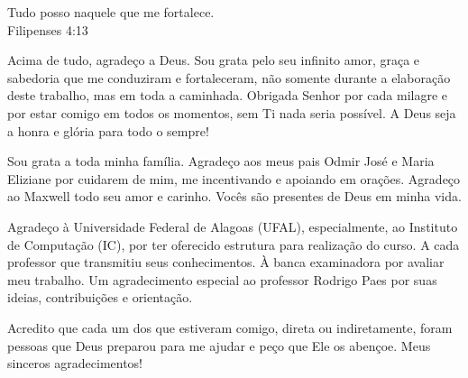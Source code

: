 \documentclass{ppgi}
\begin{document}
\imprimircapa
\imprimirfolhaderosto

\begin{dedicatoria}
\prededicatoria

\begin{flushright}
Tudo posso naquele que me fortalece.\\
Filipenses 4:13
\end{flushright}

\end{dedicatoria}

\begin{agradecimentos}

Acima de tudo, agradeço a Deus. Sou grata pelo seu infinito amor, graça e sabedoria que me conduziram e fortaleceram, não somente durante a elaboração deste trabalho, mas em toda a caminhada. Obrigada Senhor por cada milagre e por estar comigo em todos os momentos, sem Ti nada seria possível. A Deus seja a honra e glória para todo o sempre!

Sou grata a toda minha família. Agradeço aos meus pais Odmir José e Maria Eliziane por cuidarem de mim, me incentivando e apoiando em orações. Agradeço ao Maxwell todo seu amor e carinho. Vocês são presentes de Deus em minha vida. 

Agradeço à Universidade Federal de Alagoas (UFAL), especialmente, ao Instituto de Computação (IC), por ter oferecido estrutura para realização do curso. A cada professor que transmitiu seus conhecimentos. À banca examinadora por avaliar meu trabalho. Um agradecimento especial ao professor Rodrigo Paes por suas ideias, contribuições e orientação.

Acredito que cada um dos que estiveram comigo, direta ou indiretamente, foram pessoas que Deus preparou para me ajudar e peço que Ele os abençoe.
Meus sinceros agradecimentos!

\end{agradecimentos}
\end{document}
